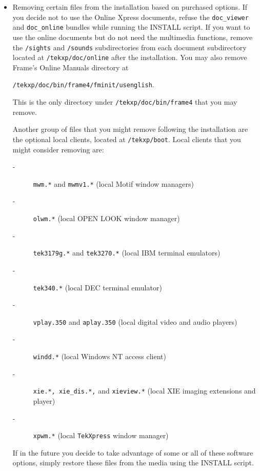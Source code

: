 \begin {itemize}
\item Removing certain files from the installation based on purchased options.
If you decide not to use the Online Xpress documents, refuse the
{\tt doc\_viewer} and {\tt doc\_online} bundles while running the INSTALL
script. If you want to use the online documents but do not need the
multimedia functions, remove the
{\tt /sights} and {\tt /sounds} subdirectories from each document subdirectory
located at {\tt /tekxp/doc/online} after the installation. You
may also remove Frame's Online Manuals directory at

{\tt /tekxp/doc/bin/frame4/fminit/usenglish}.

This is the only directory under {\tt /tekxp/doc/bin/frame4}
that you may remove.

Another group of files that you might remove following the installation are the
optional local clients, located at {\tt /tekxp/boot}. Local clients that you
might consider removing are:

\begin {description}

\item [-\ \ ] {\tt mwm.*} and {\tt mwmv1.*} (local Motif window managers)

\item [-\ \ ] {\tt olwm.*} (local OPEN LOOK window manager)

\item [-\ \ ] {\tt tek3179g.*} and {\tt tek3270.*} (local IBM terminal emulators)

\item [-\ \ ] {\tt tek340.*} (local DEC terminal emulator)

\item [-\ \ ] {\tt vplay.350} and {\tt aplay.350} (local digital video and
audio players)

\item [-\ \ ] {\tt windd.*} (local Windows NT access client)

\item [-\ \ ] {\tt xie.*, xie\_dis.*,} and {\tt xieview.*} (local XIE imaging
extensions and player)

\item [-\ \ ] {\tt xpwm.*} (local {\tt TekXpress} window manager)

\end {description}

If in the future you decide to take advantage of some or all of these software
options, simply restore these files from the media using the INSTALL script.

\end {itemize}


